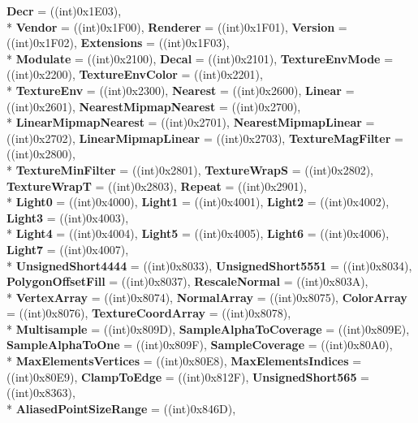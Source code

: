 \begin{DoxyCompactItemize}
{\bfseries Decr} = ((int)0x1\-E03), 
\\*
{\bfseries Vendor} = ((int)0x1\-F00), 
{\bfseries Renderer} = ((int)0x1\-F01), 
{\bfseries Version} = ((int)0x1\-F02), 
{\bfseries Extensions} = ((int)0x1\-F03), 
\\*
{\bfseries Modulate} = ((int)0x2100), 
{\bfseries Decal} = ((int)0x2101), 
{\bfseries Texture\-Env\-Mode} = ((int)0x2200), 
{\bfseries Texture\-Env\-Color} = ((int)0x2201), 
\\*
{\bfseries Texture\-Env} = ((int)0x2300), 
{\bfseries Nearest} = ((int)0x2600), 
{\bfseries Linear} = ((int)0x2601), 
{\bfseries Nearest\-Mipmap\-Nearest} = ((int)0x2700), 
\\*
{\bfseries Linear\-Mipmap\-Nearest} = ((int)0x2701), 
{\bfseries Nearest\-Mipmap\-Linear} = ((int)0x2702), 
{\bfseries Linear\-Mipmap\-Linear} = ((int)0x2703), 
{\bfseries Texture\-Mag\-Filter} = ((int)0x2800), 
\\*
{\bfseries Texture\-Min\-Filter} = ((int)0x2801), 
{\bfseries Texture\-Wrap\-S} = ((int)0x2802), 
{\bfseries Texture\-Wrap\-T} = ((int)0x2803), 
{\bfseries Repeat} = ((int)0x2901), 
\\*
{\bfseries Light0} = ((int)0x4000), 
{\bfseries Light1} = ((int)0x4001), 
{\bfseries Light2} = ((int)0x4002), 
{\bfseries Light3} = ((int)0x4003), 
\\*
{\bfseries Light4} = ((int)0x4004), 
{\bfseries Light5} = ((int)0x4005), 
{\bfseries Light6} = ((int)0x4006), 
{\bfseries Light7} = ((int)0x4007), 
\\*
{\bfseries Unsigned\-Short4444} = ((int)0x8033), 
{\bfseries Unsigned\-Short5551} = ((int)0x8034), 
{\bfseries Polygon\-Offset\-Fill} = ((int)0x8037), 
{\bfseries Rescale\-Normal} = ((int)0x803\-A), 
\\*
{\bfseries Vertex\-Array} = ((int)0x8074), 
{\bfseries Normal\-Array} = ((int)0x8075), 
{\bfseries Color\-Array} = ((int)0x8076), 
{\bfseries Texture\-Coord\-Array} = ((int)0x8078), 
\\*
{\bfseries Multisample} = ((int)0x809\-D), 
{\bfseries Sample\-Alpha\-To\-Coverage} = ((int)0x809\-E), 
{\bfseries Sample\-Alpha\-To\-One} = ((int)0x809\-F), 
{\bfseries Sample\-Coverage} = ((int)0x80\-A0), 
\\*
{\bfseries Max\-Elements\-Vertices} = ((int)0x80\-E8), 
{\bfseries Max\-Elements\-Indices} = ((int)0x80\-E9), 
{\bfseries Clamp\-To\-Edge} = ((int)0x812\-F), 
{\bfseries Unsigned\-Short565} = ((int)0x8363), 
\\*
{\bfseries Aliased\-Point\-Size\-Range} = ((int)0x846\-D), 

\end{DoxyCompactItemize}
